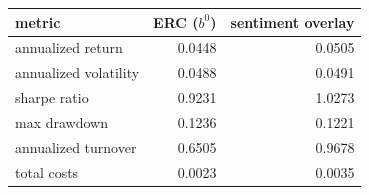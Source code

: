 \begin{tabular}{@{}lrr@{}}
\toprule
metric & ERC ($b^0$) & sentiment overlay \\
\midrule
annualized return & 0.0448 & 0.0505 \\
annualized volatility & 0.0488 & 0.0491 \\
sharpe ratio & 0.9231 & 1.0273 \\
max drawdown & 0.1236 & 0.1221 \\
annualized turnover & 0.6505 & 0.9678 \\
total costs & 0.0023 & 0.0035 \\
\bottomrule
\end{tabular}
